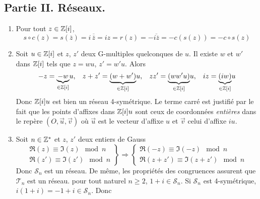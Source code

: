 \subsection*{Partie II. Réseaux.}
\begin{enumerate}
\item Pour tout $z\in \mathbb{Z}[i]$,
\begin{displaymath}
s\circ c(z) = s(\overline{z}) = i\,\overline{\overline{z}} = iz= r(z) = -\overline{i\overline{z}} = -c(s(z)) = -c \circ s (z)  
\end{displaymath}

\item Soit $u\in \mathbb{Z}[i]$ et $z$, $z'$ deux G-multiples quelconques de $u$. Il existe  $w$ et $w'$ dans $\mathbb{Z}[i]$ tels que $z=wu$, $z'=w'u$. Alors
\begin{displaymath}
  -z = \underset{\in \mathbb{Z}[i]}{\underbrace{-w}}u,\hspace{0.3cm}
  z+z' = \underset{\in \mathbb{Z}[i]}{\underbrace{(w+w')}}u,\hspace{0.3cm}
  zz' = \underset{\in \mathbb{Z}[i]}{\underbrace{(ww'u)}}u,\hspace{0.3cm}
  iz = \underset{\in \mathbb{Z}[i]}{\underbrace{(iw)}}u
\end{displaymath}
Donc $\mathbb{Z}[i]u$ est bien un réseau 4-symétrique.\newline
Le terme carré est justifié par le fait que les points d'affixes dans $\mathbb{Z}[i]u$ sont ceux de coordonnées \emph{entières} dans le repère $(O,\overrightarrow{u},\overrightarrow{v})$ où $\overrightarrow{u}$ est le vecteur d'affixe $u$ et $\overrightarrow{v}$ celui d'affixe $iu$.
\item Soit $n\in \mathbb{Z}^*$ et $z$, $z'$ deux entiers de Gauss
\begin{displaymath}
\left. 
\begin{aligned}
  \Re(z) \equiv \Im(z) \mod n \\   \Re(z') \equiv \Im(z') \mod n
\end{aligned}
\right\rbrace 
\Rightarrow
\left\lbrace 
\begin{aligned}
  \Re(-z) \equiv \Im(-z) \mod n \\   \Re(z+z') \equiv \Im(z+z') \mod n  
\end{aligned}
\right. 
\end{displaymath}
Donc $\mathcal{S}_n$ est un réseau. De même, les propriétés des congruences assurent que $\mathcal{T}_n$ est un réseau.\newline
pour tout naturel $n\geq2$, $1+i\in \mathcal{S}_n$. Si $\mathcal{S}_n$ est 4-symétrique, $i(1+i)=-1+i\in \mathcal{S}_n$. Donc 

\end{enumerate}

